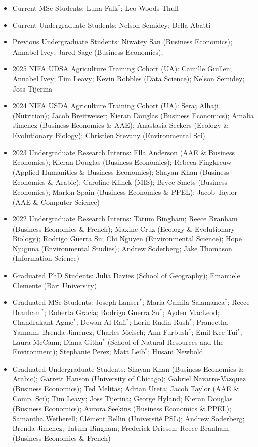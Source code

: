 \documentclass[letterpaper]{article}
\begin{document}
\begin{itemize}
	
	\item Current MSc Students: Luna Falk$^*$; Leo Woods Thull
	\item Current Undergraduate Students: Nelson Semidey; Bella Abatti
	\item Previous Undergraduate Students: Niwatey San (Business Economics); Annabel Ivey; Jared Sage (Business Economics);
    \item 2025 NIFA UDSA Agriculture Training Cohort (UA): Camille Guillen; Annabel Ivey; Tim Leavy; Kevin Robbles (Data Science); Nelson Semidey; Joss Tijerina 
	\item 2024 NIFA USDA Agriculture Training Cohort (UA): Seraj Alhaji (Nutrition); Jacob Breitweiser; Kieran Douglas (Business Economics); Amalia Jimenez (Business Economics \& AAE); Anastasia Seckers (Ecology \& Evolutionary Biology); Christien Stevany (Environmental Sci)
	\item 2023 Undergraduate Research Interns: Ella Anderson (AAE \& Business Economics); Kieran Douglas (Business Economics); Rebeca Fingkreuw (Applied Humanities \& Business Economics); Shayan Khan (Business Economics \& Arabic); Caroline Klinck (MIS); Bryce Smets (Business Economics); Marlon Spain (Business Economics \& PPEL); Jacob Taylor (AAE \& Computer Science)
	\item 2022 Undergraduate Research Interns: Tatum Bingham; Reece Branham (Business Economics \& French); Maxine Cruz (Ecology \& Evolutionary Biology); Rodrigo Guerra Su; Chi Nguyen (Environmental Science); Hope Njuguna (Environmental Studies); Andrew Soderberg; Jake Thomason (Information Science)
	\item Graduated PhD Students: Julia Davies (School of Geography); Emanuele Clemente (Bari University)
	\item Graduated MSc Students:  Joseph Lanser$^*$; Maria Camila Salamanca$^*$;  Reece Branham$^*$; Roberta Gracia; Rodrigo Guerra Su$^*$; Ayden MacLeod; Chandrakant Agme$^*$; Dewan Al Rafi$^*$; Lorin Rudin-Rush$^*$; Praneetha Yannam; Brenda Jimenez; Charles Meisch; Ann Furbush$^*$; Emil Kee-Tui$^*$; Laura McCann; Diana Githu$^*$ (School of Natural Resources and the Environment); Stephanie Perez; Matt Leib$^*$; Husani Newbold
	\item Graduated Undergraduate Students: Shayan Khan (Business Economics \& Arabic); Garrett Hanson (University of Chicago); Gabriel Navarro-Vazquez (Business Economics); Ted Melitas; Adrian Ureta; Jacob Taylor (AAE \& Comp. Sci); Tim Leavy; Joss Tijerina; George Hyland; Kieran Douglas (Business Economics); Aurora Seekins (Business Economics \& PPEL); Samantha Wetherell; Cl\'ement Bellin (Universit\'e PSL); Andrew Soderberg; Brenda Jimenez; Tatum Bingham; Frederick Driesen; Reece Branham (Business Economics \& French)
	
\end{itemize}
\end{document}
